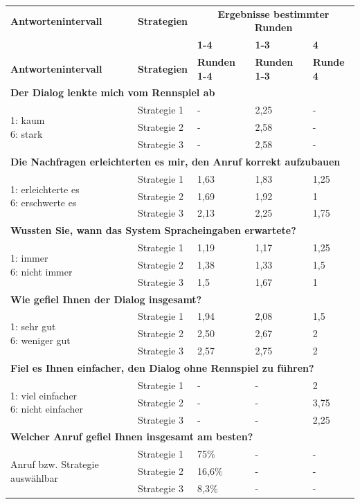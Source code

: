 \documentclass[12pt,a4paper]{scrartcl}
\begin{document}
\begin{longtable}{|p{4cm}|p{2cm}|p{2cm}|p{2cm}|p{2cm}|}
	\hline
		\textbf{Antwortenintervall}&\textbf{Strategien}&\multicolumn{3}{c|}{\textbf{Ergebnisse bestimmter Runden}}\\
	&&\textbf{1-4}&\textbf{1-3} &\textbf{4}\\
	\hline
	\endfirsthead
	\hline
	\textbf{Antwortenintervall}&\textbf{Strategien}&\textbf{Runden 1-4}&\textbf{Runden 1-3} &\textbf{Runde 4}\\
	\hline
	\endhead
		\multicolumn{5}{l}{\textbf{Der Dialog lenkte mich vom Rennspiel ab}}\\
		\hline
\multirow{3}{4cm}{1: kaum \newline 6: stark} & Strategie 1 & - & 2,25  & - \\
 & Strategie 2 & - & 2,58 & - \\
 & Strategie 3 & - & 2,58 & -\\
\hline
		\multicolumn{5}{l}{\textbf{Die Nachfragen erleichterten es mir, den Anruf korrekt aufzubauen}}\\
		\hline
\multirow{3}{4cm}{1: erleichterte es\newline  6: erschwerte es} & Strategie 1 & 1,63 & 1,83 & 1,25 \\
 & Strategie 2 & 1,69 & 1,92 & 1 \\
 & Strategie 3 & 2,13 & 2,25 & 1,75 \\
\hline
		\multicolumn{5}{l}{\textbf{Wussten Sie, wann das System Spracheingaben erwartete?}}\\
		\hline
\multirow{3}{4cm}{1: immer \newline  6: nicht immer} & Strategie 1 & 1,19 & 1,17 & 1,25 \\
 & Strategie 2 & 1,38 & 1,33 & 1,5 \\
 & Strategie 3 & 1,5 & 1,67 & 1 \\
\hline
		\multicolumn{5}{l}{\textbf{Wie gefiel Ihnen der Dialog insgesamt?}}\\
		\hline
\multirow{3}{4cm}{1: sehr gut \newline  6: weniger gut} & Strategie 1 & 1,94 & 2,08 & 1,5 \\
 & Strategie 2 & 2,50 & 2,67 & 2 \\
 & Strategie 3 & 2,57 & 2,75 & 2 \\
\hline
		\multicolumn{5}{l}{\textbf{Fiel es Ihnen einfacher, den Dialog ohne Rennspiel zu führen?}}\\
		\hline
\multirow{3}{4cm}{1: viel einfacher \newline  6: nicht einfacher} & Strategie 1 &  - & - & 2 \\
 & Strategie 2 & - & - & 3,75 \\
 & Strategie 3 & - & - & 2,25\\
\hline
		\multicolumn{5}{l}{\textbf{Welcher Anruf gefiel Ihnen insgesamt am besten?}}\\
		\hline
\multirow{3}{4cm}{Anruf bzw. Strategie auswählbar} & Strategie 1 & 75\% & - & - \\
 & Strategie 2 & 16,6\% & - & - \\
 & Strategie 3 & 8,3\% & - & - \\
\hline
\end{longtable}
\end{document}
